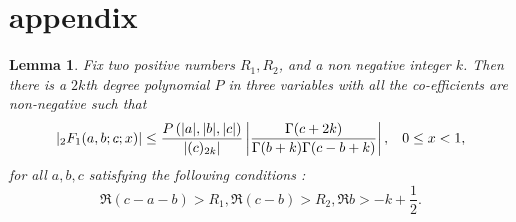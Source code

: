 \documentclass[11pt,reqno]{amsart}
\newtheorem{lemma}[theorem]{Lemma}
\theoremstyle{definition}
\theoremstyle{definition}
\numberwithin{equation}{section}
\begin{document}
\section{appendix}


\begin{lemma}\label{bound of hypergeometric functon near 1}
Fix two positive numbers $R_1,R_2$, and a non negative integer $k$. Then there is a $2k$th degree polynomial $P$ in three variables with all the co-efficients are non-negative such that
$$
\left|{}_2F_1(a,b;c;x)\right|\leq \frac{P\left(|a|,|b|,|c|\right)}{|(c)_{2k}|}\left|\frac{\Gamma(c+2k)}{\Gamma(b+k)\Gamma(c-b+k)}\right|,\hspace{3mm} 0\leq x<1,
$$
for all $a,b,c$ satisfying the following conditions :
$$
\Re (c-a-b)>R_1, \Re(c-b)>R_2, \Re b>-k+\frac{1}{2}.
$$
\end{lemma}
\end{document}
